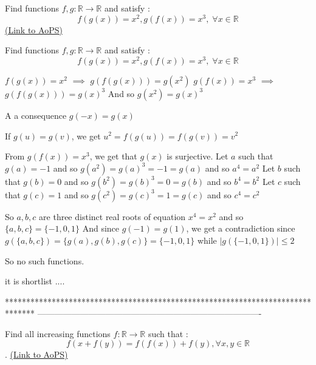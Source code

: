 \begin{problem}
	Find functions $f,g:\mathbb{R}\rightarrow \mathbb{R}$ and satisfy :
\[f(g(x))=x^2,g(f(x))=x^3,\;\forall x\in \mathbb{R}\]
	\flushright \href{https://artofproblemsolving.com/community/c6h578366}{(Link to AoPS)}
\end{problem}



\begin{solution}
	\begin{tcolorbox}Find functions $f,g:\mathbb{R}\rightarrow \mathbb{R}$ and satisfy :
\[f(g(x))=x^2,g(f(x))=x^3,\;\forall x\in \mathbb{R}\]\end{tcolorbox}
$f(g(x))=x^2$ $\implies$ $g(f(g(x)))=g(x^2)$
$g(f(x))=x^3$ $\implies$ $g(f(g(x)))=g(x)^3$
And so $g(x^2)=g(x)^3$

A a consequence $g(-x)=g(x)$

If $g(u)=g(v)$, we get $u^2=f(g(u))=f(g(v))=v^2$

From $g(f(x))=x^3$, we get that $g(x)$ is surjective.
Let $a$ such that $g(a)=-1$ and so $g(a^2)=g(a)^3=-1=g(a)$ and so $a^4=a^2$
Let $b$ such that $g(b)=0$ and so $g(b^2)=g(b)^3=0=g(b)$ and so $b^4=b^2$
Let $c$ such that $g(c)=1$ and so $g(c^2)=g(c)^3=1=g(c)$ and so $c^4=c^2$

So $a,b,c$ are three distinct real roots of equation $x^4=x^2$ and so $\{a,b,c\}=\{-1,0,1\}$
And since $g(-1)=g(1)$, we get a contradiction since $g(\{a,b,c\})=\{g(a),g(b),g(c)\}=\{-1,0,1\}$ while $|g(\{-1,0,1\})|\le 2$

So no such functions.
\end{solution}



\begin{solution}
	it is shortlist ....
\end{solution}
*******************************************************************************
-------------------------------------------------------------------------------

\begin{problem}
	Find all increasing functions $f: \mathbb{R} \to \mathbb{R}$ such that : 
\[ f(x+f(y))=f(f(x))+f(y)  , \forall x,y \in \mathbb{R} \] .
	\flushright \href{https://artofproblemsolving.com/community/c6h578442}{(Link to AoPS)}
\end{problem}



